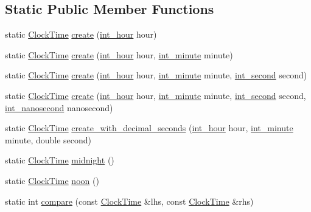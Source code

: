 \subsection*{\-Static \-Public \-Member \-Functions}
\begin{DoxyCompactItemize}
\item 
static \hyperlink{structClockTime}{\-Clock\-Time} \hyperlink{structClockTime_a72284f0c4f53d026688e55cea607f219}{create} (\hyperlink{types_8h_a62ed583cd6a13da9650111e3b4b4eedc}{int\-\_\-hour} hour)
\item 
static \hyperlink{structClockTime}{\-Clock\-Time} \hyperlink{structClockTime_aa4429a92963b67343bc6eab885938a5a}{create} (\hyperlink{types_8h_a62ed583cd6a13da9650111e3b4b4eedc}{int\-\_\-hour} hour, \hyperlink{types_8h_a3e55debfc84cabacf28bddf2d04984c9}{int\-\_\-minute} minute)
\item 
static \hyperlink{structClockTime}{\-Clock\-Time} \hyperlink{structClockTime_a3a34039699358c31a6f68d545f228728}{create} (\hyperlink{types_8h_a62ed583cd6a13da9650111e3b4b4eedc}{int\-\_\-hour} hour, \hyperlink{types_8h_a3e55debfc84cabacf28bddf2d04984c9}{int\-\_\-minute} minute, \hyperlink{types_8h_abd3494f4b69b446ec1fc0477a8b769c9}{int\-\_\-second} second)
\item 
static \hyperlink{structClockTime}{\-Clock\-Time} \hyperlink{structClockTime_afdf4e7a0b63e536f24a5eb85a3eb1ae8}{create} (\hyperlink{types_8h_a62ed583cd6a13da9650111e3b4b4eedc}{int\-\_\-hour} hour, \hyperlink{types_8h_a3e55debfc84cabacf28bddf2d04984c9}{int\-\_\-minute} minute, \hyperlink{types_8h_abd3494f4b69b446ec1fc0477a8b769c9}{int\-\_\-second} second, \hyperlink{types_8h_a153ef9bf3a8448179ab1d606f5593b4c}{int\-\_\-nanosecond} nanosecond)
\item 
static \hyperlink{structClockTime}{\-Clock\-Time} \hyperlink{structClockTime_a71e4e398da2cb0cfd3adb3f87cb6f3c2}{create\-\_\-with\-\_\-decimal\-\_\-seconds} (\hyperlink{types_8h_a62ed583cd6a13da9650111e3b4b4eedc}{int\-\_\-hour} hour, \hyperlink{types_8h_a3e55debfc84cabacf28bddf2d04984c9}{int\-\_\-minute} minute, double second)
\item 
static \hyperlink{structClockTime}{\-Clock\-Time} \hyperlink{structClockTime_a7baab35d60ad3a2236c14133d8d0083b}{midnight} ()
\item 
static \hyperlink{structClockTime}{\-Clock\-Time} \hyperlink{structClockTime_ae206b86808ff1d0158cbc920eb289797}{noon} ()
\item 
static int \hyperlink{structClockTime_a4c185648dcfc28f46ac3fc700b3415c2}{compare} (const \hyperlink{structClockTime}{\-Clock\-Time} \&lhs, const \hyperlink{structClockTime}{\-Clock\-Time} \&rhs)
\end{DoxyCompactItemize}
